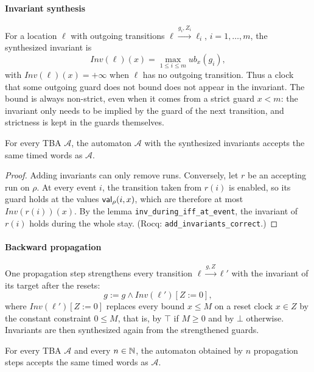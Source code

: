 \paragraph{Invariant synthesis}
For a location $\ell$ with outgoing transitions
$\ell\xrightarrow{g_i,Z_i}\ell_i$, $i=1,\dots,m$, the synthesized invariant is
\[
  \mathit{Inv}(\ell)(x)=\max_{1\le i\le m}\mathit{ub}_x(g_i),
\]
with $\mathit{Inv}(\ell)(x)=+\infty$ when $\ell$ has no outgoing transition.
Thus a clock that some outgoing guard does not bound does not appear in the
invariant.  The bound is always non-strict, even when it comes from a strict
guard $x<m$: the invariant only needs to be implied by the guard of the next
transition, and strictness is kept in the guards themselves.

\begin{theorem}
\label{thm:inv-synthesis}
For every TBA $\mathcal A$, the automaton $\mathcal A$ with the synthesized
invariants accepts the same timed words as $\mathcal A$.
\end{theorem}

\begin{proof}
Adding invariants can only remove runs.  Conversely, let $r$ be an accepting
run on $\rho$.  At every event $i$, the transition taken from $r(i)$ is enabled,
so its guard holds at the values $\mathsf{val}_\rho(i,x)$, which are therefore at most
$\mathit{Inv}(r(i))(x)$.  By the lemma \texttt{inv\_\allowbreak{}during\_\allowbreak{}iff\_\allowbreak{}at\_\allowbreak{}event}, the invariant of $r(i)$ holds during
the whole stay.  (Rocq: \texttt{add\_\allowbreak{}invariants\_\allowbreak{}correct}.)
\end{proof}

\paragraph{Backward propagation}
One propagation step strengthens every transition
$\ell\xrightarrow{g,Z}\ell'$ with the invariant of its target after the
resets:
\[
  g := g\wedge\mathit{Inv}(\ell')[Z:=0],
\]
where $\mathit{Inv}(\ell')[Z:=0]$ replaces every bound $x\le M$ on a reset clock
$x\in Z$ by the constant constraint $0\le M$, that is, by $\top$ if $M\ge0$ and
by $\bot$ otherwise.  Invariants are then synthesized again from the
strengthened guards.

\begin{theorem}
\label{thm:propagation}
For every TBA $\mathcal A$ and every $n\in\mathbb{N}$, the automaton obtained by
$n$ propagation steps accepts the same timed words as $\mathcal A$.
\end{theorem}

